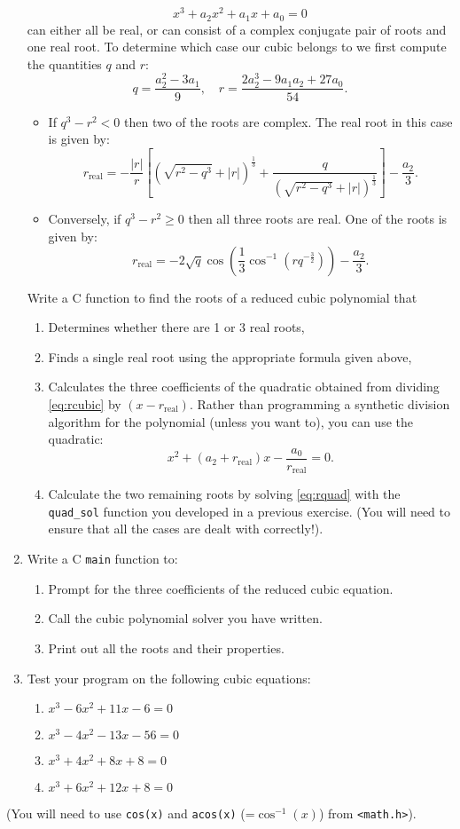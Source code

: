 \documentclass[a4paper,12pt]{article}
\begin{document}
\begin{enumerate}
\begin{equation}
\label{eq:rcubic}
x^3 + a_2x^2 + a_1x + a_0 = 0
\end{equation}
can either all be real, or can consist of a complex conjugate pair of roots and one real root. To determine which case our cubic belongs to we first compute the quantities $q$ and $r$:
$$q = \frac{a_2^2-3a_1}{9}, \quad r = \frac{2a_2^3-9a_1a_2+27a_0}{54}.$$
\begin{itemize}
\item If $q^3-r^2 < 0$ then two of the roots are complex. The real root in this case is given by:
$$r_\mathrm{real} = -\frac{|r|}{r}\left[\left(\sqrt{r^2-q^3}+|r|\right)^{\frac{1}{3}}
+\frac{q}{\left(\sqrt{r^2-q^3}+|r|\right)^{\frac{1}{3}}}\right]-\frac{a_2}{3}.
$$
\item Conversely, if $q^3-r^2\geq 0$ then all three roots are real. One of the roots is given by:
$$ r_\mathrm{real} = -2\sqrt{q}\cos\left(\frac{1}{3}\cos^{-1}(rq^{-\frac{3}{2}})\right)-\frac{a_2}{3}.$$
\end{itemize}
Write a C function to find the roots of a reduced cubic polynomial that
\begin{enumerate}
\item Determines whether there are 1 or 3 real roots,
\item Finds a single real root using the appropriate formula given above,
\item Calculates the three coefficients of the quadratic obtained from dividing \eqref{eq:rcubic} by $(x-r_\mathrm{real})$. Rather than programming a synthetic division algorithm for the polynomial (unless you want to), you can use the quadratic:
\begin{equation}
\label{eq:rquad}
x^2 + (a_2+r_\mathrm{real})x -\frac{a_0}{r_\mathrm{real}} = 0.
\end{equation}
\item Calculate the two remaining roots by solving \eqref{eq:rquad} with the {\tt quad\_sol} function you developed in a previous exercise. (You will need to ensure that all the cases are dealt with correctly!).
\end{enumerate}

\item Write a C {\tt main} function to:
\begin{enumerate}
\item Prompt for the three coefficients of the reduced cubic equation.
\item Call the cubic polynomial solver you have written.
\item Print out all the roots and their properties.
\end{enumerate}
\item Test your program on the following cubic equations:
\begin{enumerate}
\item $x^3-6x^2+11x-6 = 0$
\item $x^3-4x^2-13x-56 = 0$
\item $x^3+4x^2+8x+8 = 0$
\item $x^3+6x^2+12x+8 = 0$
\end{enumerate}
\end{enumerate}
\vfill
(You will need to use {\tt cos(x)} and {\tt acos(x)} (=$\cos^{-1}(x)$) from {\tt <math.h>}).
\end{document}
